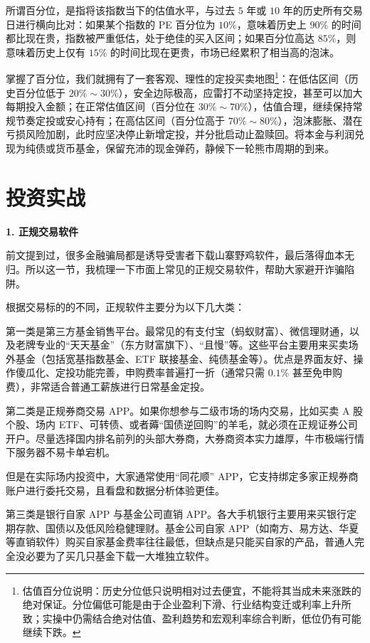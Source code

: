 \documentclass[12pt,openany]{book}
\newcommand{\subhead}[1]{%
    \par\vspace{0.5\baselineskip}%
    \noindent\textbf{#1}\par%
    \vspace{0.5\baselineskip}%
}
\begin{document}
所谓百分位，是指将该指数当下的估值水平，与过去 $5$ 年或 $10$ 年的历史所有交易日进行横向比对：如果某个指数的 PE 百分位为 $10\%$，意味着历史上 $90\%$ 的时间都比现在贵，指数被严重低估，处于绝佳的买入区间；如果百分位高达 $85\%$，则意味着历史上仅有 $15\%$ 的时间比现在更贵，市场已经累积了相当高的泡沫。

掌握了百分位，我们就拥有了一套客观、理性的定投买卖地图\footnote{估值百分位说明：历史分位低只说明相对过去便宜，不能将其当成未来涨跌的绝对保证。分位偏低可能是由于企业盈利下滑、行业结构变迁或利率上升所致；实操中仍需结合绝对估值、盈利趋势和宏观利率综合判断，低位仍有可能继续下跌。}：在低估区间（历史百分位低于 $20\%\sim 30\%$），安全边际极高，应雷打不动坚持定投，甚至可以加大每期投入金额；在正常估值区间（百分位在 $30\%\sim 70\%$），估值合理，继续保持常规节奏定投或安心持有；在高估区间（百分位高于 $70\%\sim 80\%$），泡沫膨胀、潜在亏损风险加剧，此时应坚决停止新增定投，并分批启动止盈赎回。将本金与利润兑现为纯债或货币基金，保留充沛的现金弹药，静候下一轮熊市周期的到来。

\section{投资实战}

\subhead{1. 正规交易软件}

前文提到过，很多金融骗局都是诱导受害者下载山寨野鸡软件，最后落得血本无归。所以这一节，我梳理一下市面上常见的正规交易软件，帮助大家避开诈骗陷阱。

根据交易标的的不同，正规软件主要分为以下几大类：

第一类是第三方基金销售平台。最常见的有支付宝（蚂蚁财富）、微信理财通，以及老牌专业的“天天基金”（东方财富旗下）、“且慢”等。这些平台主要用来买卖场外基金（包括宽基指数基金、ETF 联接基金、纯债基金等）。优点是界面友好、操作傻瓜化、定投功能完善，申购费率普遍打一折（通常只需 $0.1\%$ 甚至免申购费），非常适合普通工薪族进行日常基金定投。

第二类是正规券商交易 APP。如果你想参与二级市场的场内交易，比如买卖 A 股个股、场内 ETF、可转债、或者薅“国债逆回购”的羊毛，就必须在正规证券公司开户。尽量选择国内排名前列的头部大券商，大券商资本实力雄厚，牛市极端行情下服务器不易卡单宕机。

但是在实际场内投资中，大家通常使用“同花顺” APP，它支持绑定多家正规券商账户进行委托交易，且看盘和数据分析体验更佳。

第三类是银行自家 APP 与基金公司直销 APP。各大手机银行主要用来买银行定期存款、国债以及低风险稳健理财。基金公司自家 APP（如南方、易方达、华夏等直销软件）购买自家基金费率往往最低，但缺点是只能买自家的产品，普通人完全没必要为了买几只基金下载一大堆独立软件。
\end{document}
